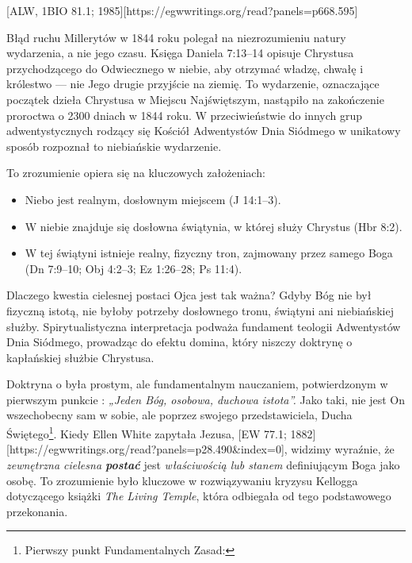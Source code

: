 [ALW, 1BIO 81.1; 1985][https://egwwritings.org/read?panels=p668.595]

Błąd ruchu Millerytów w 1844 roku polegał na niezrozumieniu natury wydarzenia, a nie jego czasu. Księga Daniela 7:13--14 opisuje Chrystusa przychodzącego do Odwiecznego w niebie, aby otrzymać władzę, chwałę i królestwo — nie Jego drugie przyjście na ziemię. To wydarzenie, oznaczające początek dzieła Chrystusa w Miejscu Najświętszym, nastąpiło na zakończenie proroctwa o 2300 dniach w 1844 roku. W przeciwieństwie do innych grup adwentystycznych rodzący się Kościół Adwentystów Dnia Siódmego w unikatowy sposób rozpoznał to niebiańskie wydarzenie.

To zrozumienie opiera się na kluczowych założeniach:
\begin{itemize}
    \item Niebo jest realnym, dosłownym miejscem (J 14:1--3).
    \item W niebie znajduje się dosłowna świątynia, w której służy Chrystus (Hbr 8:2).
    \item W tej świątyni istnieje realny, fizyczny tron, zajmowany przez samego Boga (Dn 7:9--10; Obj 4:2--3; Ez 1:26--28; Ps 11:4).
\end{itemize}

Dlaczego kwestia cielesnej postaci Ojca jest tak ważna? Gdyby Bóg nie był fizyczną istotą, nie byłoby potrzeby dosłownego tronu, świątyni ani niebiańskiej służby. Spirytualistyczna interpretacja podważa fundament teologii Adwentystów Dnia Siódmego, prowadząc do efektu domina, który niszczy doktrynę o kapłańskiej służbie Chrystusa.

Doktryna o  była prostym, ale fundamentalnym nauczaniem, potwierdzonym w pierwszym punkcie : \textit{„Jeden Bóg, osobowa, duchowa istota”.} Jako taki, nie jest On wszechobecny sam w sobie, ale poprzez swojego przedstawiciela, Ducha Świętego\footnote{Pierwszy punkt Fundamentalnych Zasad: }. Kiedy Ellen White zapytała Jezusa, [EW 77.1; 1882][https://egwwritings.org/read?panels=p28.490&index=0], widzimy wyraźnie, że \textit{zewnętrzna cielesna \textbf{postać}} jest \textit{właściwością lub stanem} definiującym Boga jako osobę. To zrozumienie było kluczowe w rozwiązywaniu kryzysu Kellogga dotyczącego książki \textit{The Living Temple}, która odbiegała od tego podstawowego przekonania.

